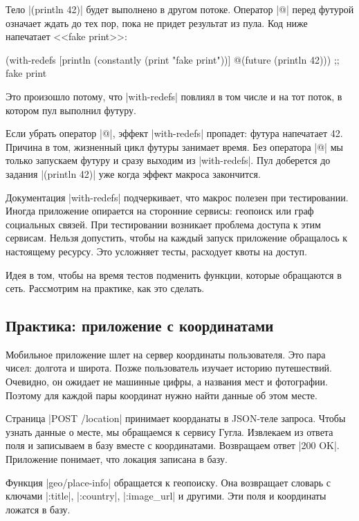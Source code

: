 Тело \spverb|(println 42)| будет выполнено в другом потоке. Оператор \spverb|@|
перед футурой означает ждать до тех пор, пока не придет результат из пула. Код
ниже напечатает <<fake print>>:

\begin{english}
  \begin{clojure}
(with-redefs
  [println (constantly (print "fake print"))]
  @(future (println 42)))
;; fake print
  \end{clojure}
\end{english}

Это произошло потому, что \spverb|with-redefs| повлиял в том числе и на тот
поток, в котором пул выполнил футуру.

Если убрать оператор \spverb|@|, эффект \spverb|with-redefs| пропадет: футура
напечатает 42. Причина в том, жизненный цикл футуры занимает время. Без
оператора \spverb|@| мы только запускаем футуру и сразу выходим из
\spverb|with-redefs|. Пул доберется до задания \spverb|(println 42)| уже когда
эффект макроса закончится.

Документация \spverb|with-redefs| подчеркивает, что макрос полезен при
тестировании. Иногда приложение опирается на сторонние сервисы: геопоиск или
граф социальных связей. При тестировании возникает проблема доступа к этим
сервисам. Нельзя допустить, чтобы на каждый запуск приложение обращалось к
настоящему ресурсу. Это усложняет тесты, расходует квоты на доступ.

Идея в том, чтобы на время тестов подменить функции, которые обращаются в
сеть. Рассмотрим на практике, как это сделать.

\subsection{Практика: приложение с координатами}

Мобильное приложение шлет на сервер координаты пользователя. Это пара чисел:
долгота и широта. Позже пользователь изучает историю путешествий. Очевидно, он
ожидает не машинные цифры, а названия мест и фотографии. Поэтому для каждой пары
координат нужно найти данные об этом месте.

Страница \spverb|POST /location| принимает коорданаты в JSON-теле запроса. Чтобы
узнать данные о месте, мы обращаемся к сервису Гугла. Извлекаем из ответа поля и
записываем в базу вместе с координатами. Возвращаем ответ \spverb|200 OK|.
Приложение понимает, что локация записана в базу.

Функция \spverb|geo/place-info| обращается к геопоиску. Она возвращает словарь с
ключами \spverb|:title|, \spverb|:country|, \spverb|:image_url| и другими. Эти
поля и координаты ложатся в базу.

